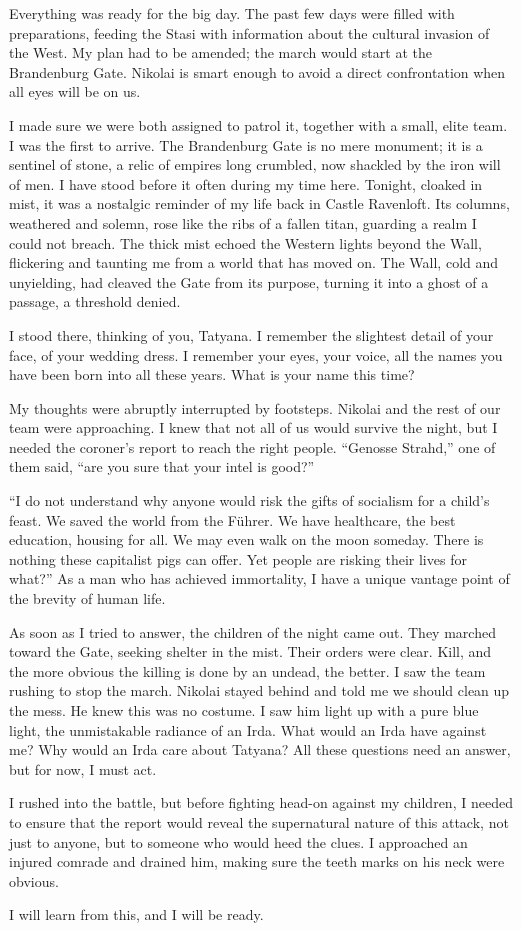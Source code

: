 
Everything was ready for the big day.
The past few days were filled with preparations, feeding the Stasi with information about the cultural invasion of the West.
My plan had to be amended; the march would start at the Brandenburg Gate.
Nikolai is smart enough to avoid a direct confrontation when all eyes will be on us.

I made sure we were both assigned to patrol it, together with a small, elite team.
I was the first to arrive.
The Brandenburg Gate is no mere monument; it is a sentinel of stone, a relic of empires long crumbled, now shackled by the iron will of men.
I have stood before it often during my time here.
Tonight, cloaked in mist, it was a nostalgic reminder of my life back in Castle Ravenloft.
Its columns, weathered and solemn, rose like the ribs of a fallen titan, guarding a realm I could not breach.
The thick mist echoed the Western lights beyond the Wall, flickering and taunting me from a world that has moved on.
The Wall, cold and unyielding, had cleaved the Gate from its purpose, turning it into a ghost of a passage, a threshold denied.

I stood there, thinking of you, Tatyana.
I remember the slightest detail of your face, of your wedding dress.
I remember your eyes, your voice, all the names you have been born into all these years.
What is your name this time?

My thoughts were abruptly interrupted by footsteps.
Nikolai and the rest of our team were approaching.
I knew that not all of us would survive the night, but I needed the coroner's report to reach the right people.
``Genosse Strahd,'' one of them said, ``are you sure that your intel is good?''

``I do not understand why anyone would risk the gifts of socialism for a child's feast.
We saved the world from the Führer.
We have healthcare, the best education, housing for all.
We may even walk on the moon someday.
There is nothing these capitalist pigs can offer.
Yet people are risking their lives for what?''
As a man who has achieved immortality, I have a unique vantage point of the brevity of human life.

As soon as I tried to answer, the children of the night came out.
They marched toward the Gate, seeking shelter in the mist.
Their orders were clear.
Kill, and the more obvious the killing is done by an undead, the better.
I saw the team rushing to stop the march.
Nikolai stayed behind and told me we should clean up the mess.
He knew this was no costume.
I saw him light up with a pure blue light, the unmistakable radiance of an Irda.
What would an Irda have against me? Why would an Irda care about Tatyana? All these questions need an answer, but for now, I must act.

I rushed into the battle, but before fighting head-on against my children, I needed to ensure that the report would reveal the supernatural nature of this attack, not just to anyone, but to someone who would heed the clues.
I approached an injured comrade and drained him, making sure the teeth marks on his neck were obvious.

I will learn from this, and I will be ready.
\vfill\newpage
